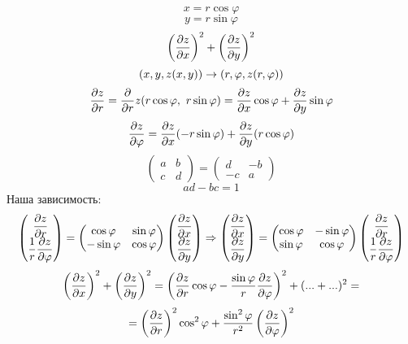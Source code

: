 \documentclass[main]{subfiles}
\begin{document}
\begin{enumerate}
        \begin{Example}
            \[x = r \cos \varphi\]
            \[y = r \sin \varphi\]
            \[\left(\dfrac{\partial z}{\partial x}\right)^2 + \left(\dfrac{\partial z}{\partial y}\right)^2\]
            \[(x,y,z(x,y)) \rightarrow (r,\varphi, z(r,\varphi))\]
            \[\dfrac{\partial z}{\partial r} = \dfrac{\partial }{\partial r} z (r \cos \varphi,\ r \sin\varphi) = \dfrac{\partial z}{\partial x} \cos \varphi + \dfrac{\partial z}{\partial y} \sin \varphi\]
            \[\dfrac{\partial z}{\partial \varphi} = \dfrac{\partial z}{\partial x} (-r \sin \varphi) + \dfrac{\partial z}{\partial y}(r \cos \varphi)\]
            \[\begin{pmatrix}
                a & b\\
                c & d
            \end{pmatrix} = \begin{pmatrix}
                d & -b\\
                -c & a
            \end{pmatrix}\]
            \[ad - bc = 1\]
            Наша зависимость:
            \[\begin{pmatrix}
                \dfrac{\partial z}{\partial r}\\
                \dfrac{1}{r} \dfrac{\partial z}{\partial \varphi}
            \end{pmatrix} = \begin{pmatrix}
                \cos \varphi & \sin \varphi\\
                -\sin \varphi & \cos \varphi
            \end{pmatrix} \begin{pmatrix}
                \dfrac{\partial z}{\partial x}\\
                \dfrac{\partial z}{\partial y}
            \end{pmatrix} \Rightarrow \begin{pmatrix}
                \dfrac{\partial z}{\partial x}\\
                \dfrac{\partial z}{\partial y}
            \end{pmatrix} = \begin{pmatrix}
                \cos \varphi & -\sin \varphi\\
                \sin \varphi & \cos \varphi
            \end{pmatrix} \begin{pmatrix}
                \dfrac{\partial z}{\partial r}\\
                \dfrac{1}{r} \dfrac{\partial z}{\partial \varphi}
            \end{pmatrix}\]
            \[\left(\dfrac{\partial z}{\partial x}\right)^2 + \left(\dfrac{\partial z}{\partial y}\right)^2 = \left(\dfrac{\partial z}{\partial r} \cos \varphi - \dfrac{\sin \varphi}{r} \dfrac{\partial z}{\partial \varphi}\right)^2 + (...+...)^2 = \]
            \[= \left(\dfrac{\partial z}{\partial r}\right)^2 \cos^2 \varphi + \dfrac{\sin^2 \varphi}{r^2} \left(\dfrac{\partial z}{\partial \varphi}\right)^2\]
        \end{Example}


\end{enumerate}
\end{document}
